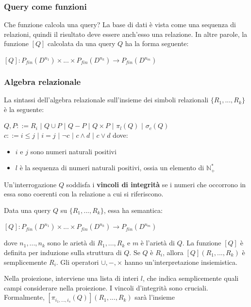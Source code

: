 \documentclass{article}
\begin{document}
\subsubsection{Query come funzioni}
Che funzione calcola una query? La base di dati è vista come una sequenza di relazioni, quindi il risultato deve essere anch'esso una relazione. In altre parole, la funzione $[Q]$ calcolata da una query $Q$ ha la forma seguente:

$[Q]:P_{fin}(D^{n_1})\times...\times P_{fin}(D^{n_k})\to P_{fin}(D^{n_m})$

\subsubsection{Algebra relazionale}
La sintassi dell'algebra relazionale sull'insieme dei simboli relazionali $\{R_1,...,R_k\}$ è la seguente:

\noindent$Q,P::= R_i\,\,|\,\,Q\cup P\,\,|\,\,Q-P\,\,|\,\,Q\times P\,\,|\,\,\pi_l(Q)\,\,|\,\,\sigma_c(Q)$\\
$c::= i\leq j\,\,|\,\,i=j\,\,|\,\,\lnot c\,\,|\,\,c\land d\,\,|\,\,c\lor d$
dove:
\begin{itemize}
    \item $i$ e $j$ sono numeri naturali positivi
    \item $l$ è la sequenza di numeri naturali positivi, ossia un elemento di $\mathbb{N}_+^*$
\end{itemize}
Un'interrogazione $Q$ soddisfa i \textbf{vincoli di integrità} se i numeri che occorrono in essa sono coerenti con la relazione a cui si riferiscono.

\bigskip

Data una query $Q$ su $\{R_1,...,R_k\}$, essa ha semantica:

\begin{center}
$[Q]:P_{fin}(D^{n_1})\times...\times P_{fin}(D^{n_k})\to P_{fin}(D^{n_m})$
\end{center}

dove $n_1,...,n_k$ sono le arietà di $R_1,...,R_k$ e $m$ è l'arietà di $Q$. La funzione $[Q]$ è definita per induzione sulla struttura di $Q$. Se $Q$ è $R_i$, allora $[Q](R_1,...,R_k)$ è semplicemente $R_i$. Gli operatori $\cup, -,\times$ hanno un'interpretazione insiemistica.

\bigskip

Nella proiezione, interviene una lista di interi $l$, che indica semplicemente quali campi considerare nella proiezione.
I vincoli d'integrità sono cruciali. Formalmente, $[\pi_{i_1,...,i_s}(Q)](R_1,...,R_k)$ sarà l'insieme
\end{document}
